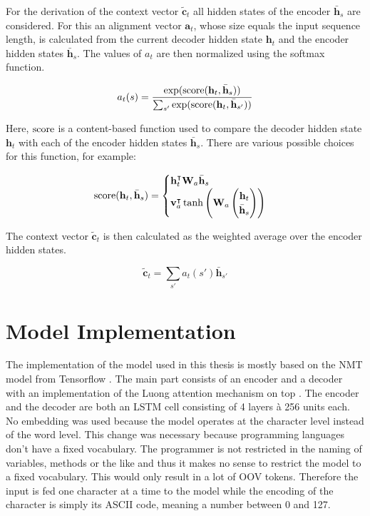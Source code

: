 For the derivation of the context vector \(\tilde{\mathbf{c}}_t\) all hidden states of the encoder \(\bar{\mathbf{h}}_s\) are considered. For this an alignment vector \(\mathbf{a}_t\), whose size equals the input sequence length, is calculated from the current decoder hidden state \(\mathbf{h}_t\) and the encoder hidden states \(\bar{\mathbf{h}}_s\). The values of \(a_t\) are then normalized using the softmax function.

\begin{equation*}
  a_t(s) = \frac
            {\exp(\operatorname{score}(\mathbf{h}_t, \bar{\mathbf{h}}_s))}
            {\sum_{s'} \exp(\operatorname{score}(\mathbf{h}_t, \bar{\mathbf{h}}_{s'}))}
\end{equation*}

Here, \(\operatorname{score}\) is a content-based function used to compare the decoder hidden state \(\mathbf{h}_t\) with each of the encoder hidden states \(\bar{\mathbf{h}}_s\). There are various possible choices for this function, for example:

\begin{equation*}
  \operatorname{score}(\mathbf{h}_t, \bar{\mathbf{h}}_s) =
  \begin{cases}
    \mathbf{h}_t^\intercal \mathbf{W}_a \bar{\mathbf{h}}_s \\
    \mathbf{v}_a^\intercal \tanh \left(\mathbf{W}_a \begin{pmatrix} \mathbf{h}_t \\ \bar{\mathbf{h}}_s \end{pmatrix} \right)
  \end{cases}
\end{equation*}

The context vector \(\tilde{\mathbf{c}}_t\) is then calculated as the weighted average over the encoder hidden states.

\begin{equation*}
  \tilde{\mathbf{c}}_t = \sum_{s'} a_t(s') \bar{\mathbf{h}}_{s'}
\end{equation*}

\section{Model Implementation}

The implementation of the model used in this thesis is mostly based on the NMT model from Tensorflow \cite{seq2seq_tutorial}. The main part consists of an encoder and a decoder with an implementation of the Luong attention mechanism on top \cite{attention_luong}. The encoder and the decoder are both an LSTM cell consisting of 4 layers \`a 256 units each. No embedding was used because the model operates at the character level instead of the word level. This change was necessary because programming languages don't have a fixed vocabulary. The programmer is not restricted in the naming of variables, methods or the like and thus it makes no sense to restrict the model to a fixed vocabulary. This would only result in a lot of OOV tokens. Therefore the input is fed one character at a time to the model while the encoding of the character is simply its ASCII code, meaning a number between 0 and 127.

